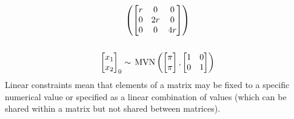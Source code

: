 \documentclass[]{article}
\def\MVN{\,\textup{\textrm{MVN}}}
\begin{document}
\begin{gather*}
\begin{pmatrix}
 \begin{bmatrix}r&0&0\\0&2r&0\\0&0&4r\end{bmatrix} \end{pmatrix}  \\
\\
\begin{bmatrix}x_1\\ x_2\end{bmatrix}_0 \sim \MVN\begin{pmatrix}\begin{bmatrix}\pi\\ \pi\end{bmatrix},\begin{bmatrix}1&0\\ 0&1\end{bmatrix} \end{pmatrix}
\end{gather*}
Linear constraints mean that elements of a matrix may be fixed to a specific numerical value or specified as a linear combination of values (which can be shared within a matrix but not shared between matrices).
\end{document}

